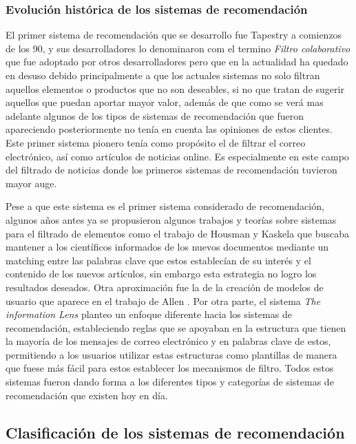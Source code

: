 \subsubsection{Evolución histórica de los sistemas de recomendación}

El primer sistema de recomendación que se desarrollo fue Tapestry \cite{Goldberg:1992:UCF:138859.138867} a comienzos de los 90, y sus desarrolladores lo denominaron com el termino \textit{Filtro colaborativo} que fue adoptado por otros desarrolladores pero que en la actualidad ha quedado en desuso debido principalmente a que los actuales sistemas no solo filtran aquellos elementos o productos que no son deseables, si no que tratan de sugerir aquellos que puedan aportar mayor valor, además de que como se verá mas adelante algunos de los tipos de sistemas de recomendación que fueron apareciendo posteriormente no tenía en cuenta las opiniones de estos clientes. Este primer sistema pionero tenía como propósito el de filtrar el correo electrónico,  así como artículos de noticias online. Es especialmente en este campo del filtrado de noticias donde los primeros sistemas de recomendación tuvieron mayor auge. 

 Pese a que este sistema es el primer sistema considerado de recomendación, algunos años antes ya se propusieron algunos trabajos y teorías sobre sistemas para el filtrado de elementos como el trabajo de Housman y Kaskela \cite{4322444} que buscaba mantener a los científicos informados de los nuevos documentos mediante un matching entre las palabras clave que estos establecían de su interés y el contenido de los nuevos artículos, sin embargo esta estrategia no logro los resultados deseados. Otra aproximación fue la de la creación de modelos de usuario que aparece en el trabajo de Allen \cite{allen1990user}. Por otra parte, el sistema \textit{The information Lens} \cite{Malone:1986:ILI:22339.22340} planteo un enfoque diferente hacia los sistemas de recomendación, estableciendo reglas que se apoyaban en la estructura que tienen la mayoría de los mensajes de correo electrónico y en palabras clave de estos, permitiendo a los usuarios utilizar estas estructuras como plantillas de manera que fuese más fácil para estos establecer los mecanismos de filtro. Todos estos sistemas fueron dando forma a los diferentes tipos y categorías de sistemas de recomendación que existen hoy en día.

\subsection{Clasificación de los sistemas de recomendación}

